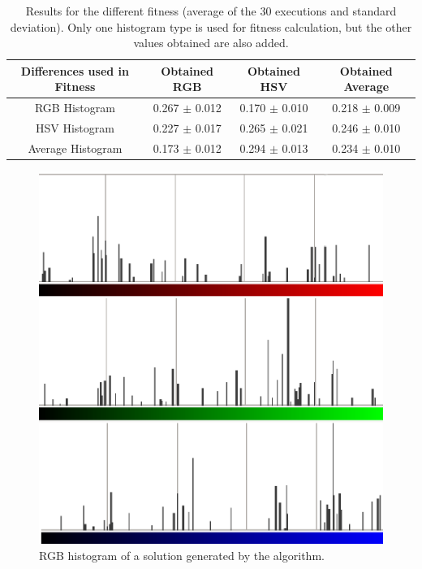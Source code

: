 \documentclass[a4paper,twoside]{article}
\begin{document}
\begin{table}
\centering
\caption{Results for the different fitness (average of the 30 executions and standard deviation). Only one histogram type is used for fitness calculation, but the other values obtained are also added.}
\begin{tabular}{|c|c|c|c|} \hline
Differences used  in Fitness & Obtained RGB      & Obtained HSV  & Obtained Average \\ \hline
RGB Histogram    & 0.267 $\pm$ 0.012	& 0.170 $\pm$ 0.010 	& 0.218 $\pm$ 0.009	\\ \hline
HSV Histogram    & 0.227 $\pm$ 0.017	& 0.265 $\pm$ 0.021	& 0.246 $\pm$ 0.010 \\ \hline
Average Histogram& 0.173 $\pm$ 0.012	& 0.294 $\pm$ 0.013	& 0.234 $\pm$ 0.010 \\ \hline
\end{tabular}
\label{tab:results}
\end{table}

\begin{figure}
\centering
   \includegraphics[scale =0.6] {images/individuohist.eps}
\caption{RGB histogram of a solution generated by the algorithm.}
\label{fig:histoind}
\end{figure}
\end{document}
